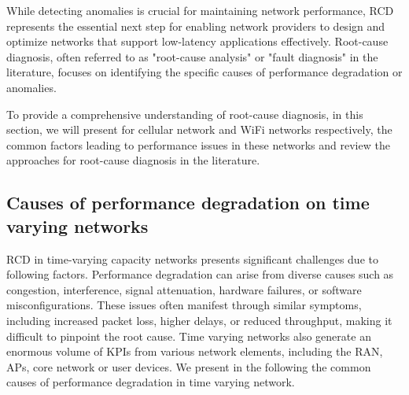 While detecting anomalies is crucial for maintaining network performance, \ac{RCD} represents the essential next step for enabling network providers to design and optimize networks that support low-latency applications effectively. Root-cause diagnosis, often referred to as "root-cause analysis" or "fault diagnosis" in the literature, focuses on identifying the specific causes of performance degradation or anomalies.

To provide a comprehensive understanding of root-cause diagnosis, in this section, we will present for cellular network and WiFi networks respectively, the common factors leading to performance issues in these networks and review the approaches for root-cause diagnosis in the literature.



\subsection{Causes of performance degradation on time varying networks}

RCD in time-varying capacity networks presents significant challenges due to following factors. Performance degradation can arise from diverse causes such as congestion, interference, signal attenuation, hardware failures, or software misconfigurations. These issues often manifest through similar symptoms, including increased packet loss, higher delays, or reduced throughput, making it difficult to pinpoint the root cause. Time varying networks also generate an enormous volume of KPIs from various network elements, including the RAN, APs, core network or user devices. We present in the following the common causes of performance degradation in time varying network.
 
